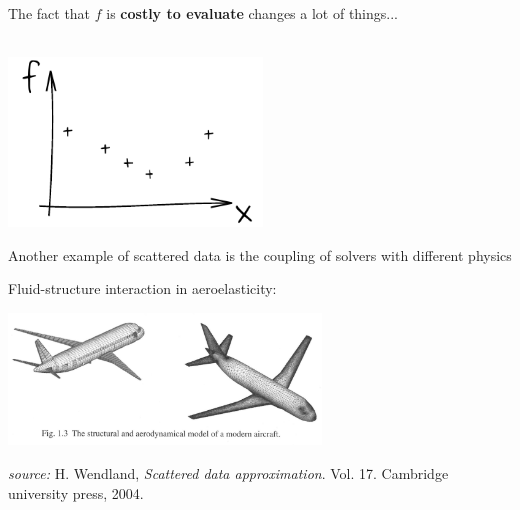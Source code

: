 \documentclass{beamer}
\begin{document}
\begin{frame}{}
The fact that $f$ is \textbf{costly to evaluate} changes a lot of things...\\
\vspace{5mm}
\\
\vspace{5mm}
\begin{center}
\includegraphics[height=4.5cm]{figures/ink_fX}
\end{center}
\end{frame}

\begin{frame}{}
Another example of scattered data is the coupling of solvers with different physics 
\begin{example}
Fluid-structure interaction in aeroelasticity:
\begin{center}
\includegraphics[height=3.5cm]{figures/wenland}
\end{center}
{\small \hfill \emph{source:} H. Wendland, \emph{Scattered data approximation}. Vol. 17. Cambridge university press, 2004.}
\end{example}
\end{frame}


\end{document}
